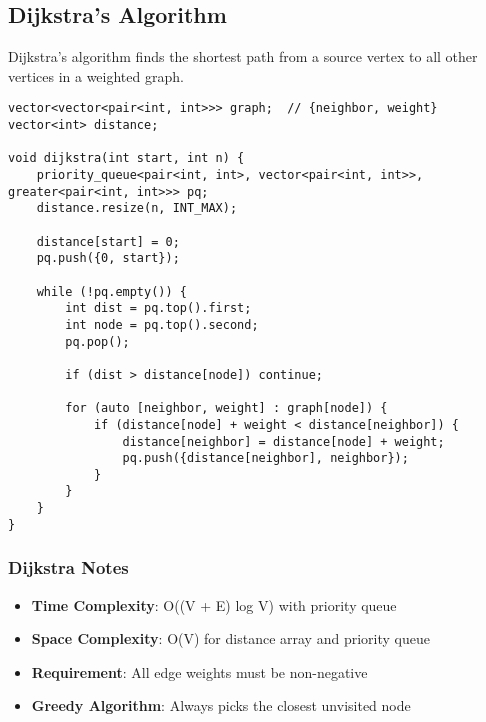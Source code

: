 \documentclass[11pt,a4paper]{article}
\begin{document}
\newpage
\subsection{Dijkstra's Algorithm}
Dijkstra's algorithm finds the shortest path from a source vertex to all other vertices in a weighted graph.

\begin{lstlisting}[caption={Dijkstra's Algorithm}]
vector<vector<pair<int, int>>> graph;  // {neighbor, weight}
vector<int> distance;

void dijkstra(int start, int n) {
    priority_queue<pair<int, int>, vector<pair<int, int>>, greater<pair<int, int>>> pq;
    distance.resize(n, INT_MAX);
    
    distance[start] = 0;
    pq.push({0, start});
    
    while (!pq.empty()) {
        int dist = pq.top().first;
        int node = pq.top().second;
        pq.pop();
        
        if (dist > distance[node]) continue;
        
        for (auto [neighbor, weight] : graph[node]) {
            if (distance[node] + weight < distance[neighbor]) {
                distance[neighbor] = distance[node] + weight;
                pq.push({distance[neighbor], neighbor});
            }
        }
    }
}
\end{lstlisting}

\subsubsection*{Dijkstra Notes}
\begin{itemize}
\item \textbf{Time Complexity}: O((V + E) log V) with priority queue
\item \textbf{Space Complexity}: O(V) for distance array and priority queue
\item \textbf{Requirement}: All edge weights must be non-negative
\item \textbf{Greedy Algorithm}: Always picks the closest unvisited node
\end{itemize}
\end{document}
